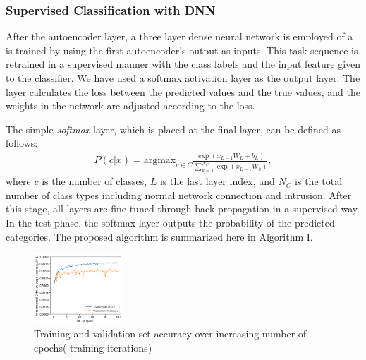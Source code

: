 \documentclass[letterpaper, 10pt, conference]{ieeeconf} %
\begin{document}
\subsubsection{ Supervised Classification with DNN}
After the autoencoder layer, a three layer dense neural network is employed of a  is trained by using the first autoencoder's output as inputs. This task sequence is retrained in a supervised manner with the class labels and the input feature given to the classifier. We have used a softmax activation layer as the output layer. The layer calculates the loss between the predicted values and the true values, and the weights in the network are adjusted according to the loss. 

The simple \emph{softmax} layer, which is placed at the final layer, can be defined as follows:
\begin{align}\label{eq3}
P\left( {c |x} \right) = {\text{argmax}}_{c \in C} \frac{{{ \exp }(x_{L - 1} W_{L} + b_{L} )}}{{\mathop \sum \nolimits_{k = 1}^{{N_{C} }} { \exp }(x_{L - 1} W_{k} )}},
\end{align}
where   $c$  is the number of classes,   $L$  is the last layer index, and $N_{C}$ is the total number of class types including normal network connection and intrusion.
After this stage, all layers are fine-tuned through back-propagation in a supervised way. In the test phase, the softmax layer outputs the probability of the predicted categories. The proposed algorithm is summarized here in Algorithm I.


 \begin{figure}
      \centering
\includegraphics[width=0.30\textwidth]{Figures/Autoencode_DNN.png}
\caption{ Training and validation set accuracy over increasing number of epochs( training iterations) }
      \label{fig:accuracy}
    \end{figure}

\end{document}

